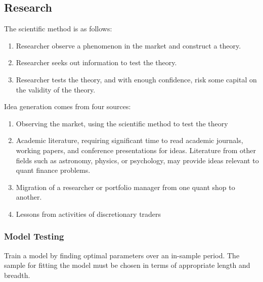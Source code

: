 \subsection{Research}

The scientific method is as follows: 
\begin{enumerate}[label=\arabic*.]
\setlength{\itemsep}{0pt}
\item Researcher observe a phenomenon in the market and construct a theory.
\item Researcher seeks out information to test the theory.
\item Researcher tests the theory, and with enough confidence, risk some capital on the validity of the theory.
\end{enumerate}

Idea generation comes from four sources:
\begin{enumerate}[label=\arabic*.]
\setlength{\itemsep}{0pt}
\item Observing the market, using the scientific method to test the theory
\item Academic literature, requiring significant time to read academic journals, working papers, and conference presentations for ideas. Literature from other fields such as astronomy, physics, or psychology, may provide ideas relevant to quant finance problems.
\item Migration of a researcher or portfolio manager from one quant shop to another.
\item Lessons from activities of discretionary traders
\end{enumerate}

\subsubsection{Model Testing}

 Train a model by finding optimal parameters over an in-sample period. The sample for fitting the model must be chosen in terms of appropriate length and breadth.\\

